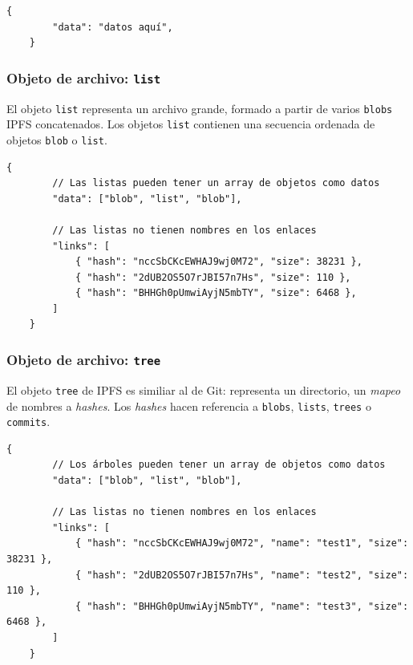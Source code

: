 \documentclass[12pt]{article} %
\begin{document}
\begin{lstlisting}[caption={Estructura JSON de un \texttt{blob}.}]
	{
		"data": "datos aquí",
	}
\end{lstlisting}


\subsubsection{Objeto de archivo: \texttt{list}} %
\label{ssub:objeto_de_archivo_list}

El objeto \texttt{list} representa un archivo grande, formado a partir de varios \texttt{blobs} IPFS concatenados. Los objetos \texttt{list} contienen una secuencia ordenada de objetos \texttt{blob} o \texttt{list}.

\begin{lstlisting}[caption={Estructura JSON de un \texttt{list}.}]
	{
		// Las listas pueden tener un array de objetos como datos
		"data": ["blob", "list", "blob"],

		// Las listas no tienen nombres en los enlaces
		"links": [
			{ "hash": "nccSbCKcEWHAJ9wj0M72", "size": 38231 },
			{ "hash": "2dUB2OS5O7rJBI57n7Hs", "size": 110 },
			{ "hash": "BHHGh0pUmwiAyjN5mbTY", "size": 6468 },
		]
	}
\end{lstlisting}


\subsubsection{Objeto de archivo: \texttt{tree}} %
\label{ssub:objeto_de_archivo_tree}

El objeto \texttt{tree} de IPFS es similiar al de Git: representa un directorio, un \textit{mapeo} de nombres a \textit{hashes}. Los \textit{hashes} hacen referencia a \texttt{blobs}, \texttt{lists}, \texttt{trees} o \texttt{commits}.

\begin{lstlisting}[caption={Estructura JSON de un \texttt{tree}.}]
	{
		// Los árboles pueden tener un array de objetos como datos
		"data": ["blob", "list", "blob"],

		// Las listas no tienen nombres en los enlaces
		"links": [
			{ "hash": "nccSbCKcEWHAJ9wj0M72", "name": "test1", "size": 38231 },
			{ "hash": "2dUB2OS5O7rJBI57n7Hs", "name": "test2", "size": 110 },
			{ "hash": "BHHGh0pUmwiAyjN5mbTY", "name": "test3", "size": 6468 },
		]
	}
\end{lstlisting}
\end{document}
